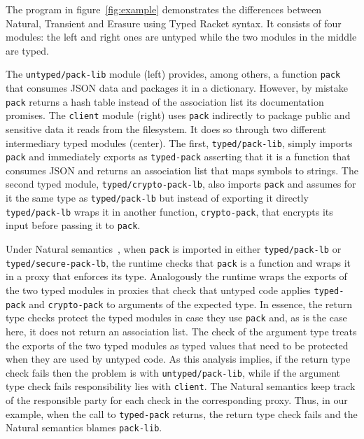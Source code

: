 
The  program in figure~\ref{fig:example} demonstrates the differences
between Natural, Transient and Erasure using Typed Racket syntax.  It
consists of four modules: the left and right ones are untyped while
the two modules in the middle are typed.

The \texttt{untyped/pack-lib} module (left) provides, among
others, a function \texttt{pack} that consumes JSON data and packages it
in a dictionary. However, by mistake \texttt{pack} returns
a hash table instead of the association list its documentation promises.
The \texttt{client} module (right) uses \texttt{pack} indirectly to
package public and sensitive data it reads from the filesystem. It does so
through two different intermediary typed modules (center). The first,
\texttt{typed/pack-lib}, simply imports \texttt{pack} and immediately
exports as \texttt{typed-pack} asserting that it is a function
that consumes JSON and returns an association list that maps symbols to
strings. The second typed module, \texttt{typed/crypto-pack-lb},
also imports \texttt{pack} and assumes for it the same type as
\texttt{typed/pack-lb} but instead of exporting it directly \texttt{typed/pack-lb} wraps it in
another function, \texttt{crypto-pack}, that encrypts its input before
passing it to \texttt{pack}.

Under Natural semantics~\cite{tf-popl-2008,tfffgksst-snapl-2017}, when
\texttt{pack} is imported in either \texttt{typed/pack-lb} or
\texttt{typed/secure-pack-lb}, the runtime checks that \texttt{pack} is a
function and wraps it in a proxy that enforces its  type.  Analogously
the runtime wraps the exports of the two typed modules in proxies that
check that untyped code applies \texttt{typed-pack} and
\texttt{crypto-pack} to arguments of the expected type. In essence, the
return type checks protect  the typed modules in case they use
\texttt{pack} and, as is the case here, it does not return an association
list. The check of the argument type  treats the
exports of the two typed modules as typed values that need to be protected
when they are used by untyped code.  As this analysis implies, if the
return type check fails then the problem is with
\texttt{untyped/pack-lib}, while if the argument type check fails
responsibility lies with \texttt{client}. The Natural semantics keep track
of the responsible party for each check in the corresponding proxy. Thus,
in our example, when the call to \texttt{typed-pack} returns, the return
type check fails and the Natural semantics blames \texttt{pack-lib}.

